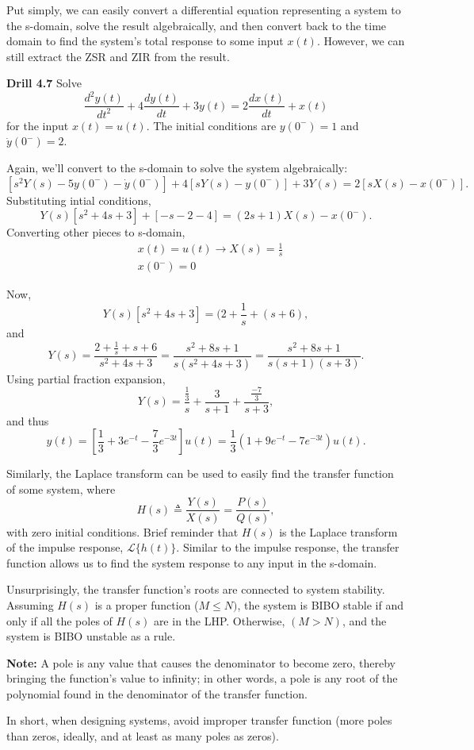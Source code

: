\documentclass{article}
\begin{document}
Put simply, we can easily convert a differential equation representing a system to the s-domain, solve the result algebraically, and then convert back to the time domain to find the system's total response to some input \(x(t)\). However, we can still extract the ZSR and ZIR from the result.

\textbf{Drill 4.7}
Solve 
\[
  \frac{d^2y(t)}{dt^2}+4\frac{dy(t)}{dt} +3y(t) = 2\frac{dx(t)}{dt}+x(t)
\]
for the input \(x(t) = u(t)\). The initial conditions are \(y(0^-)=1\) and \(\dot{y}(0^-)=2\).

Again, we'll convert to the s-domain to solve the system algebraically:
\[
	[s^2Y(s)-5y(0^-)-\dot{y}(0^-)]+4[sY(s)-y(0^-)]+3Y(s)=2[sX(s)-x(0^-)].
\]
Substituting intial conditions,
\[
	Y(s)[s^2+4s+3]+[-s-2-4]=(2s+1)X(s)-x(0^-).
\]
Converting other pieces to s-domain,
\begin{align*}
	&x(t)=u(t) \to X(s) = \frac{1}{s} \\
	&x(0^-) = 0
\end{align*}

Now,
\[
	Y(s)[s^2+4s+3]=(2+\frac{1}{s}+(s+6),
\]
and 
\[
  Y(s) = \frac{2+\frac{1}{s}+s+6}{s^2+4s+3} = \frac{s^2+8s+1}{s(s^2+4s+3)} = \frac{s^2+8s+1}{s(s+1)(s+3)}.
\]
Using partial fraction expansion,
\[
  Y(s) = \frac{\frac{1}{3}}{s}+\frac{3}{s+1}+\frac{\frac{-7}{3}}{s+3},
\]
and thus
\[
	y(t) = [\frac{1}{3} + 3e^{-t} - \frac{7}{3}e^{-3t}]u(t) = \frac{1}{3}(1+9e^{-t}-7e^{-3t})u(t).
\]

Similarly, the Laplace transform can be used to easily find the transfer function of some system, where 
\[
  H(s) \triangleq \frac{Y(s)}{X(s)}=\frac{P(s)}{Q(s)},
\]
with zero initial conditions. Brief reminder that \(H(s)\) is the Laplace transform of the impulse response, \(\mathcal{L}\{h(t)\}\). Similar to the impulse response, the transfer function allows us to find the system response to any input in the s-domain.

Unsurprisingly, the transfer function's roots are connected to system stability. Assuming \(H(s)\) is a proper function (\(M \leq N)\), the system is BIBO stable if and only if all the poles of \(H(s)\) are in the LHP. Otherwise, \((M > N)\), and the system is BIBO unstable as a rule.

\textbf{Note:} A pole is any value that causes the denominator to become zero, thereby bringing the function's value to infinity; in other words, a pole is any root of the polynomial found in the denominator of the transfer function.

In short, when designing systems, avoid improper transfer function (more poles than zeros, ideally, and at least as many poles as zeros).
\end{document}
